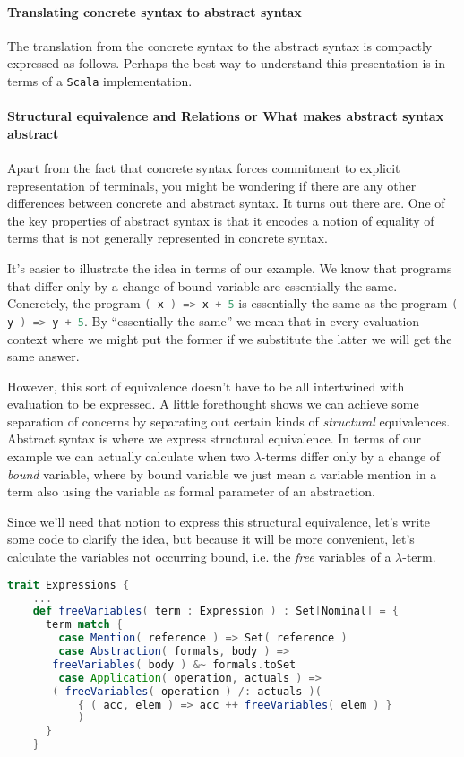 \paragraph{Translating concrete syntax to abstract syntax}
The translation from the concrete syntax to the abstract syntax is
compactly expressed as follows. Perhaps the best way to understand
this presentation is in terms of a \texttt{Scala} implementation.

\paragraph{Structural equivalence and Relations or What makes abstract syntax abstract}

Apart from the fact that concrete syntax forces commitment to explicit
representation of terminals, you might be wondering if there are any
other differences between concrete and abstract syntax. It turns out
there are. One of the key properties of abstract syntax is that it
encodes a notion of equality of terms that is not generally
represented in concrete syntax.

It's easier to illustrate the idea in terms of our example. We know
that programs that differ only by a change of bound variable are
essentially the same. Concretely, the program
\lstinline[language=Scala]!( x ) => x + 5! is essentially the same as
the program \lstinline[language=Scala]!( y ) => y + 5!. By
``essentially the same'' we mean that in every evaluation context
where we might put the former if we substitute the latter we will get
the same answer. 

However, this sort of equivalence doesn't have to be all intertwined
with evaluation to be expressed. A little forethought shows we can
achieve some separation of concerns by separating out certain kinds of
\emph{structural} equivalences. Abstract syntax is where we express
structural equivalence. In terms of our example we can actually
calculate when two $\lambda$-terms differ only by a change of
\emph{bound} variable, where by bound variable we just mean a variable
mention in a term also using the variable as formal parameter of an
abstraction. 

Since we'll need that notion to express this structural equivalence,
let's write some code to clarify the idea, but because it will be more
convenient, let's calculate the variables not occurring bound,
i.e. the \emph{free} variables of a $\lambda$-term.

\break
\begin{lstlisting}[language=Scala]
  trait Expressions {
    ...
    def freeVariables( term : Expression ) : Set[Nominal] = {
      term match {
        case Mention( reference ) => Set( reference )
        case Abstraction( formals, body ) =>
	   freeVariables( body ) &~ formals.toSet
        case Application( operation, actuals ) =>
	   ( freeVariables( operation ) /: actuals )(
           { ( acc, elem ) => acc ++ freeVariables( elem ) } 
           )
      }
    }
\end{lstlisting}

